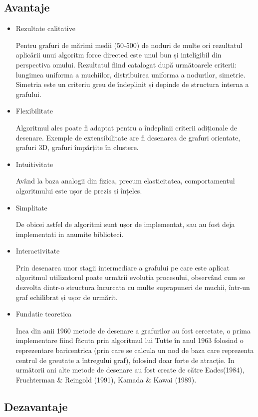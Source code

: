 \subsection{Avantaje}
\begin{itemize}
\item Rezultate calitative

Pentru grafuri de mărimi medii (50-500) de noduri de multe ori rezultatul aplicării unui algoritm force directed este 
unul bun și inteligibil din perspectiva omului. Rezultatul fiind catalogat după următoarele criterii: lungimea uniforma 
a muchiilor, distribuirea uniforma a nodurilor, simetrie. Simetria este un criteriu greu de îndeplinit și depinde de 
structura interna a grafului.
\item Flexibilitate

Algoritmul ales poate fi adaptat pentru a îndeplinii criterii adiționale de desenare. 
Exemple de extensibilitate are fi desenarea de grafuri orientate, grafuri 3D, grafuri împărțite în clustere.
\item Intuitivitate

Având la baza analogii din fizica, precum elasticitatea, comportamentul algoritmului este ușor de prezis și înțeles.
\item Simplitate

De obicei astfel de algoritmi sunt ușor de implementat, sau au fost deja implementati in anumite biblioteci.
\item Interactivitate

Prin desenarea unor stagii intermediare a grafului pe care este aplicat algoritmul utilizatorul poate urmării evoluția 
procesului, observând cum se dezvolta dintr-o structura încurcata cu multe suprapuneri de muchii, într-un graf echilibrat 
și ușor de urmărit.
\item Fundatie teoretica 

Inca din anii 1960 metode de desenare a grafurilor au fost cercetate, o prima implementare fiind făcuta 
prin algoritmul lui Tutte în anul 1963 folosind o reprezentare baricentrica (prin care se calcula un nod 
de baza care reprezenta centrul de greutate a întregului graf), folosind doar forte de atracție. 
In următorii ani alte metode de desenare au fost create de către Eades(1984), Fruchterman \& Reingold (1991), Kamada \& Kawai (1989).

\end{itemize}

\subsection{Dezavantaje}

